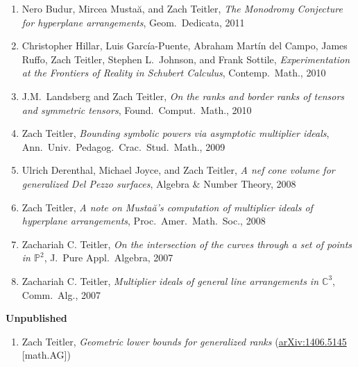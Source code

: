 \documentclass[12pt]{article}
\begin{document}
\begin{enumerate}[revarabic,leftmargin=*]
\item
Nero Budur, Mircea Musta\u{a}, and Zach Teitler,
\emph{The Monodromy Conjecture for hyperplane arrangements},
Geom.\ Dedicata,
2011

\item
Christopher Hillar, Luis Garc\'ia-Puente, Abraham Mart\'in del Campo, James Ruffo, Zach Teitler,
Stephen L.\ Johnson, and Frank Sottile,
\emph{Experimentation at the Frontiers of Reality in Schubert Calculus},
Contemp.\ Math.,
2010

\item J.M.~Landsberg and Zach Teitler,
\emph{On the ranks and border ranks of tensors and symmetric tensors},
Found.\ Comput.\ Math.,
2010

\item Zach Teitler,
\emph{Bounding symbolic powers via asymptotic multiplier ideals},
Ann.\ Univ.\ Pedagog.\ Crac.\ Stud.\ Math.,
2009

\item Ulrich Derenthal, Michael Joyce, and Zach Teitler,
\emph{A nef cone volume for generalized Del Pezzo surfaces},
Algebra \& Number Theory,
2008

\item Zach Teitler,
\emph{A note on Musta\u{a}'s computation of multiplier ideals of hyperplane arrangements},
Proc.\ Amer.\ Math.\ Soc.,
2008

\item Zachariah C. Teitler,
\emph{On the intersection of the curves through a set of points in $\mathbb{P}^2$},
J.\ Pure Appl.\ Algebra,
2007

\item Zachariah C. Teitler,
\emph{Multiplier ideals of general line arrangements in $\mathbb{C}^3$},
Comm.\ Alg.,
2007

\end{enumerate}


\textbf{Unpublished}
\begin{enumerate}[revarabic]
\item Zach Teitler,
\emph{Geometric lower bounds for generalized ranks} %
(\href{http://arxiv.org/abs/1406.5145}{arXiv:1406.5145} [math.AG])
\end{enumerate}
\end{document}
